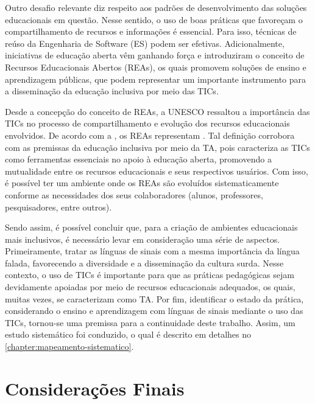 Outro desafio relevante diz respeito aos padrões de desenvolvimento das soluções educacionais em questão. Nesse sentido, o uso de boas práticas que favoreçam o compartilhamento de recursos e informações é essencial. Para isso, técnicas de reúso da Engenharia de Software (ES) podem ser efetivas. Adicionalmente, iniciativas de educação aberta vêm ganhando força e introduziram o conceito de Recursos Educacionais Abertos (REAs), os quais promovem soluções de ensino e aprendizagem públicas, que podem representar um importante instrumento para a disseminação da educação inclusiva por meio das TICs.

Desde a concepção do conceito de REAs, a UNESCO ressaltou a importância das TICs no processo de compartilhamento e evolução dos recursos educacionais envolvidos. De acordo com a , os REAs representam . Tal definição corrobora com as premissas da educação inclusiva por meio da TA, pois caracteriza as TICs como ferramentas essenciais no apoio à educação aberta, promovendo a mutualidade entre os recursos educacionais e seus respectivos usuários. Com isso, é possível ter um ambiente onde os REAs são evoluídos sistematicamente conforme as necessidades dos seus colaboradores (alunos, professores, pesquisadores, entre outros).

Sendo assim, é possível concluir que, para a criação de ambientes educacionais mais inclusivos, é necessário levar em consideração uma série de aspectos. Primeiramente, tratar as línguas de sinais com a mesma importância da língua falada, favorecendo a diversidade e a disseminação da cultura surda. Nesse contexto, o uso de TICs é importante para que as práticas pedagógicas sejam devidamente apoiadas por meio de recursos educacionais adequados, os quais, muitas vezes, se caracterizam como TA. Por fim, identificar o estado da prática, considerando o ensino e aprendizagem com línguas de sinais mediante o uso das TICs, tornou-se uma premissa para a continuidade deste trabalho. Assim, um estudo sistemático foi conduzido, o qual é descrito em detalhes no \autoref{chapter:mapeamento-sistematico}.

\section{Considerações Finais}
\label{fundamentacao-teorica:fim}


